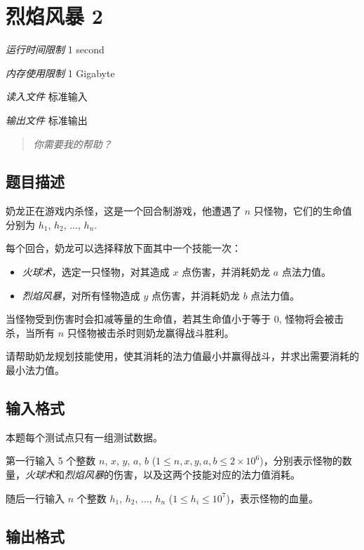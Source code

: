 \section[J. 烈焰风暴 2]{ 烈焰风暴 2}

\textit{运行时间限制}   1 second

\textit{内存使用限制} 1 Gigabyte

\textit{读入文件} \qquad 标准输入

\textit{输出文件} \qquad 标准输出

\begin{quote}
   \textit{你需要我的帮助？}
\end{quote}


\subsection{题目描述}

奶龙正在游戏内杀怪，这是一个回合制游戏，他遭遇了 $n$ 只怪物，它们的生命值分别为 $h_1$, $h_2$, $\ldots$, $h_n$.

每个回合，奶龙可以选择释放下面其中一个技能一次：
\begin{itemize}
   \item \textit{火球术}，选定一只怪物，对其造成 $x$ 点伤害，并消耗奶龙 $a$ 点法力值。
   \item \textit{烈焰风暴}，对所有怪物造成 $y$ 点伤害，并消耗奶龙 $b$ 点法力值。
\end{itemize}

当怪物受到伤害时会扣减等量的生命值，若其生命值小于等于 $0$, 怪物将会被击杀，当所有 $n$ 只怪物被击杀时则奶龙赢得战斗胜利。

请帮助奶龙规划技能使用，使其消耗的法力值最小并赢得战斗，并求出需要消耗的最小法力值。

\subsection{输入格式}

本题每个测试点只有一组测试数据。

第一行输入 5 个整数 $n$, $x$, $y$, $a$, $b$ ($1 \le n, x, y, a, b \le 2 \times 10^6$)，分别表示怪物的数量，\textit{火球术}和\textit{烈焰风暴}的伤害，以及这两个技能对应的法力值消耗。

随后一行输入 $n$ 个整数 $h_1$, $h_2$, $\ldots$, $h_n$ ($1 \le h_i \le 10^7$)，表示怪物的血量。

\subsection{输出格式}

